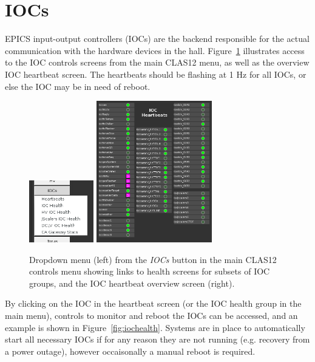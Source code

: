\documentclass[amsmath,amssymb,notitlepage,11pt]{revtex4}
\begin{document}
\clearpage

\section{IOCs}
EPICS input-output controllers (IOCs) are the backend responsible for the actual communication with the hardware devices in the hall.  Figure~\ref{fig:iocmenu} illustrates access to the IOC controls screens from the main CLAS12 menu, as well as the overview IOC heartbeat screen.  The heartbeats should be flashing at 1 Hz for all IOCs, or else the IOC may be in need of reboot.  

\begin{figure}[htbp]\centering
  \includegraphics[width=0.25\textwidth]{pics/iocmenu}
  \includegraphics[width=0.45\textwidth]{pics/iocbeats}
  \caption{Dropdown menu (left) from the {\em IOCs} button in the main CLAS12 controls menu showing links to health screens for subsets of IOC groups, and the IOC heartbeat overview screen (right).\label{fig:iocmenu}}
\end{figure}

By clicking on the IOC in the heartbeat screen (or the IOC health group in the main menu), controls to monitor and reboot the IOCs can be accessed, and an example is shown in Figure~\ref{fig:iochealth}.  Systems are in place to automatically start all necessary IOCs if for any reason they are not running (e.g. recovery from a power outage), however occaisonally a manual reboot is required.
\end{document}
